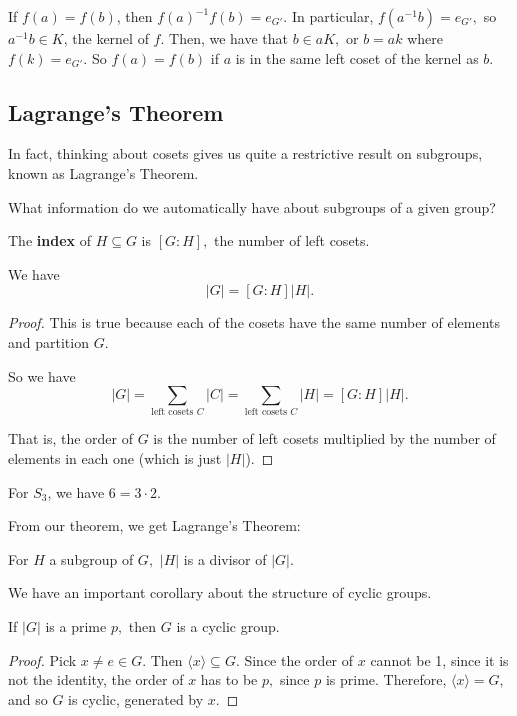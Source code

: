 \begin{ans}
If $f(a) = f(b)$, then $f(a)^{-1} f(b) = e_{G'}.$ In particular, $f(a^{-1}b) = e_{G'},$ so $a^{-1}b \in K$, the kernel of $f.$ Then, we have that $b \in aK,$ or $b = ak$ where $f(k) = e_{G'}.$ So $f(a) = f(b)$ if $a$ is in the same left coset of the kernel as $b.$

\end{ans}

\subsection{Lagrange's Theorem}

In fact, thinking about cosets gives us quite a restrictive result on subgroups, known as Lagrange's Theorem.
\begin{qq}
What information do we automatically have about subgroups of a given group?
\end{qq}
\begin{definition}
The \textbf{index} of $H \subseteq G$ is $[G: H],$ the number of left cosets. 
\end{definition}

\begin{theorem}
We have
\[
|G| = [G:H]|H|.
\]
\end{theorem}

\begin{proof}
This is true because each of the cosets have the same number of elements and partition $G$. 

So we have
\[
|G| = \sum_{\text{left cosets } C} |C| = \sum_{\text{left cosets } C} |H| = [G:H]|H|.
\]

That is, the order of $G$ is the number of left cosets multiplied by the number of elements in each one (which is just $|H|$).
\end{proof}
\begin{example}
For $S_3$, we have $6 = 3 \cdot 2.$
\end{example}

From our theorem, we get Lagrange's Theorem:
\begin{corollary}
For $H$ a subgroup of $G,$ $|H|$ is a divisor of $|G|.$
\end{corollary}

We have an important corollary about the structure of cyclic groups.
\begin{corollary}
If $|G|$ is a prime $p,$ then $G$ is a cyclic group. 
\end{corollary}
\begin{proof}
Pick $x \neq e \in G.$ Then $\langle x \rangle \subseteq G$. Since the order of $x$ cannot be 1, since it is not the identity, the order of $x$ has to be $p,$ since $p$ is prime. Therefore, $\langle x \rangle = G,$ and so $G$ is cyclic, generated by $x.$
\end{proof}

